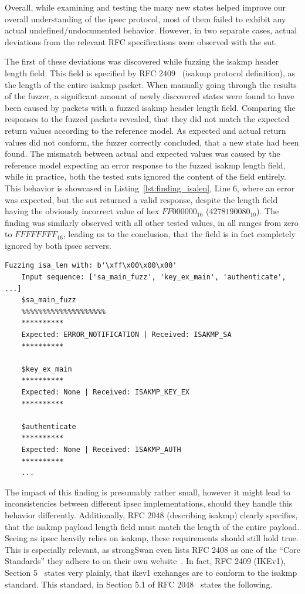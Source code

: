 Overall, while examining and testing the many new states helped improve our overall understanding of the \ac{ipsec} protocol, most of them failed to exhibit any actual undefined/undocumented behavior. However, in two separate cases, actual deviations from the relevant RFC specifications were observed with the \ac{sut}. 

The first of these deviations was discovered while fuzzing the \ac{isakmp} header length field. This field is specified by RFC 2409~\cite{rfc:isakmp} (\ac{isakmp} protocol definition), as the length of the entire \ac{isakmp} packet. When manually going through the results of the fuzzer, a significant amount of newly discovered states were found to have been caused by packets with a fuzzed \ac{isakmp} header length field. Comparing the responses to the fuzzed packets revealed, that they did not match the expected return values according to the reference model. As expected and actual return values did not conform, the fuzzer correctly concluded, that a new state had been found. The mismatch between actual and expected values was caused by the reference model expecting an error response to the fuzzed \ac{isakmp} length field, while in practice, both the tested \acp{sut} ignored the content of the field entirely. This behavior is showcased in Listing~\ref{lst:finding_isalen}, Line 6, where an error was expected, but the \ac{sut} returned a valid response, despite the length field having the obviously incorrect value of hex $FF000000_{16}$ ($4278190080_{10}$). The finding was similarly observed with all other tested values, in all ranges from zero to $FFFFFFFF_{16}$, leading us to the conclusion, that the field is in fact completely ignored by both \ac{ipsec} servers.

\begin{lstlisting}[float=h, caption=Finding showing the ISAKMP length field being ignored, label=lst:finding_isalen]
	Fuzzing isa_len with: b'\xff\x00\x00\x00'
	Input sequence: ['sa_main_fuzz', 'key_ex_main', 'authenticate', ...]
	$sa_main_fuzz
	%%%%%%%%%%%%%%%%%%%%
	**********
	Expected: ERROR_NOTIFICATION | Received: ISAKMP_SA
	**********
	
	$key_ex_main
	**********
	Expected: None | Received: ISAKMP_KEY_EX
	**********
	
	$authenticate
	**********
	Expected: None | Received: ISAKMP_AUTH
	**********
	...
\end{lstlisting}

The impact of this finding is presumably rather small, however it might lead to inconsistencies between different \ac{ipsec} implementations, should they handle this behavior differently. Additionally, RFC 2048 (describing \ac{isakmp}) clearly specifies, that the \ac{isakmp} payload length field must match the length of the entire payload. Seeing as \ac{ipsec} heavily relies on \ac{isakmp}, these requirements should still hold true. This is especially relevant, as strongSwan even lists RFC 2408 as one of the ``Core Standards'' they adhere to on their own website~\cite{strongswan-ietf}. In fact, RFC 2409 (IKEv1), Section 5~\cite{rfc:ikev1} states very plainly, that \ac{ike}v1 exchanges are to conform to the \ac{isakmp} standard.
This standard, in Section 5.1 of RFC 2048~\cite{rfc:isakmp} states the following. 

